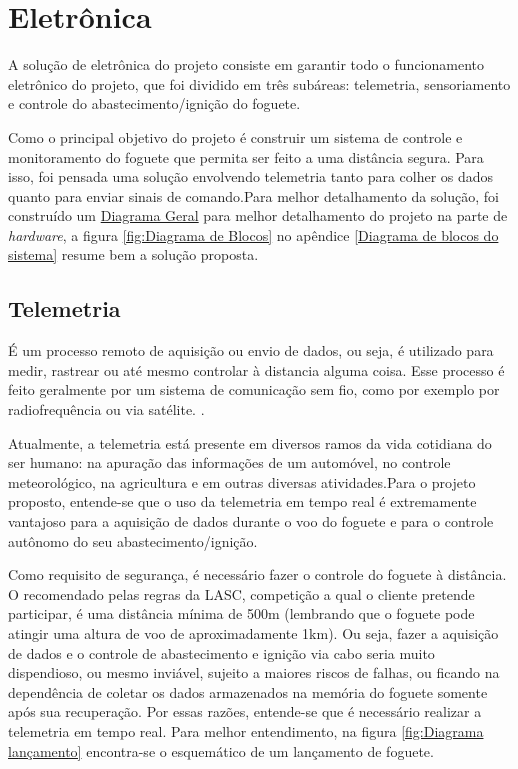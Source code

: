 \chapter{Eletrônica}
\par A solução de eletrônica do projeto consiste em garantir todo o funcionamento eletrônico do projeto, que foi dividido em três subáreas: telemetria, sensoriamento e controle do abastecimento/ignição do foguete.
\par Como o principal objetivo do projeto é construir um sistema de controle e monitoramento do foguete que permita  ser feito a uma distância segura. Para isso, foi pensada uma solução envolvendo telemetria tanto para colher os dados quanto para enviar sinais de comando.Para melhor detalhamento da solução, foi construído um  \href{https://drive.google.com/file/d/12-pXv5L2Z5AuyWWVIr8VZ4WMghu7SYDw/view?usp=sharing}{Diagrama Geral}  para melhor detalhamento do projeto na parte de \textit{hardware}, a figura \ref{fig:Diagrama de Blocos} no apêndice \ref{Diagrama de blocos do sistema} resume bem a solução proposta.
 
\section{Telemetria}

\par É um processo remoto de aquisição ou envio de dados, ou seja, é utilizado para medir, rastrear ou até mesmo controlar à distancia alguma coisa. Esse processo é feito geralmente por um sistema de comunicação sem fio, como por exemplo por radiofrequência ou via satélite. \cite{Telemetria_AERONALTICA}.
\par Atualmente,  a telemetria está presente em diversos ramos da vida cotidiana do ser humano: na apuração das informações de um automóvel, no controle meteorológico, na agricultura e em outras diversas atividades.Para o projeto proposto, entende-se que o uso da telemetria em tempo real é extremamente vantajoso para a aquisição de dados durante o voo do foguete e para o controle autônomo do seu abastecimento/ignição.
\par Como requisito de segurança, é necessário fazer o controle  do foguete à distância. O recomendado pelas regras da LASC, competição a qual o cliente pretende participar, é uma distância mínima de 500m (lembrando que o foguete pode atingir uma altura de voo de aproximadamente 1km). Ou seja, fazer a aquisição de dados e o controle de abastecimento e ignição via cabo seria muito dispendioso, ou mesmo inviável, sujeito a maiores riscos de falhas, ou ficando na dependência de coletar os dados armazenados na memória do foguete somente após sua recuperação. Por essas razões, entende-se que é necessário realizar a telemetria em tempo real. Para melhor entendimento, na figura \ref{fig:Diagrama lançamento}   encontra-se o esquemático de um lançamento de foguete.

